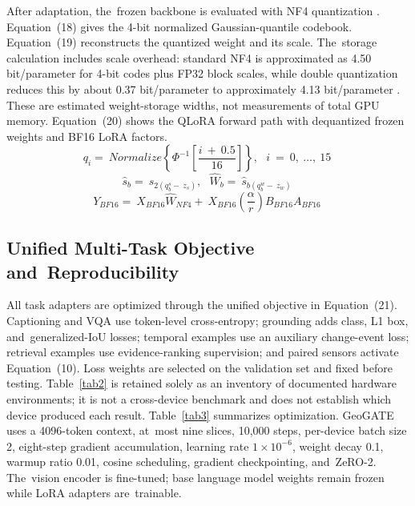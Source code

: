 \documentclass[applsci,article,accept,moreauthors]{Definitions/mdpi}
\begin{document}
After adaptation, the~frozen backbone is evaluated with NF4 quantization \citep{ref30}. \linebreak Equation~(18) gives the 4-bit normalized Gaussian-quantile codebook. Equation~(19) reconstructs the quantized weight and its scale. The~storage calculation includes scale overhead: standard NF4 is approximated as 4.50 bit/parameter for 4-bit codes plus FP32 block scales, while double quantization reduces this by about 0.37 bit/parameter to approximately 4.13 bit/parameter \citep{ref30}. These are estimated weight-storage widths, not measurements of total GPU memory. Equation~(20) shows the QLoRA forward path with dequantized frozen weights and BF16 LoRA factors.
\begin{equation}
q_{i} = \ Normalize\left\{ \Phi^{- 1}\left[ \frac{i\  + \ 0.5}{16} \right] \right\},\ \ \ i\  = \ 0,\ \ldots,\ 15\
\label{eq18}
\end{equation}
\begin{equation}
\hat{s}_{b} = \ s_{2\left( q_{b}^{s} - \ z_{s} \right)},\ \ \ {\widehat{W}}_{b} = \ \hat{s}_{b\left( q_{b}^{w} - \ z_{w} \right)}\
\label{eq19}
\end{equation}
\begin{equation}
Y_{BF16} = \ X_{BF16}{\widehat{W}}_{NF4} + \ X_{BF16}\left( \frac{\alpha}{r} \right)B_{BF16}A_{BF16}\
\label{eq20}
\end{equation}

\subsection{Unified Multi-Task Objective and~Reproducibility}

All task adapters are optimized through the unified objective in Equation~(21). Captioning and VQA use token-level cross-entropy; grounding adds class, L1 box, and~generalized-IoU losses; temporal examples use an auxiliary change-event loss; retrieval examples use evidence-ranking supervision; and paired sensors activate Equation~(10). Loss weights are selected on the validation set and fixed before testing. Table~\ref{tab2} is retained solely as an inventory of documented hardware environments; it is not a cross-device benchmark and does not establish which device produced each result. Table~\ref{tab3} summarizes optimization. GeoGATE uses a 4096-token context, at~most nine slices, 10,000 steps, per-device batch size 2, eight-step gradient accumulation, learning rate $1 \times 10^{-6}$, weight decay 0.1, warmup ratio 0.01, cosine scheduling, gradient checkpointing, and~ZeRO-2. The~vision encoder is fine-tuned; base language model weights remain frozen while LoRA adapters are~trainable.
\vspace{-10pt}
\end{document}
